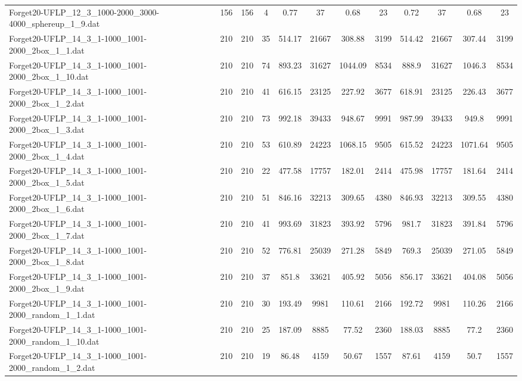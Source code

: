\begin{sidewaystable}[!ht]
{\begin{tabular}{lccccccccccc}
Forget20-UFLP\_12\_3\_1000-2000\_3000-4000\_sphereup\_1\_9.dat & 156 & 156 & 4 & 0.77 & 37 & 0.68 & 23 & 0.72 & 37 & 0.68 & 23 \\
Forget20-UFLP\_14\_3\_1-1000\_1001-2000\_2box\_1\_1.dat & 210 & 210 & 35 & 514.17 & 21667 & 308.88 & 3199 & 514.42 & 21667 &  \textcolor{blue2}{307.44} & 3199 \\
Forget20-UFLP\_14\_3\_1-1000\_1001-2000\_2box\_1\_10.dat & 210 & 210 & 74 & 893.23 & 31627 & 1044.09 & 8534 & 888.9 & 31627 & 1046.3 & 8534 \\
Forget20-UFLP\_14\_3\_1-1000\_1001-2000\_2box\_1\_2.dat & 210 & 210 & 41 & 616.15 & 23125 & 227.92 & 3677 & 618.91 & 23125 & 226.43 & 3677 \\
Forget20-UFLP\_14\_3\_1-1000\_1001-2000\_2box\_1\_3.dat & 210 & 210 & 73 & 992.18 & 39433 &  \textcolor{blue2}{948.67} & 9991 & 987.99 & 39433 & 949.8 & 9991 \\
Forget20-UFLP\_14\_3\_1-1000\_1001-2000\_2box\_1\_4.dat & 210 & 210 & 53 & 610.89 & 24223 & 1068.15 & 9505 & 615.52 & 24223 & 1071.64 & 9505 \\
Forget20-UFLP\_14\_3\_1-1000\_1001-2000\_2box\_1\_5.dat & 210 & 210 & 22 & 477.58 & 17757 & 182.01 & 2414 & 475.98 & 17757 & 181.64 & 2414 \\
Forget20-UFLP\_14\_3\_1-1000\_1001-2000\_2box\_1\_6.dat & 210 & 210 & 51 & 846.16 & 32213 & 309.65 & 4380 & 846.93 & 32213 &  \textcolor{blue2}{309.55} & 4380 \\
Forget20-UFLP\_14\_3\_1-1000\_1001-2000\_2box\_1\_7.dat & 210 & 210 & 41 & 993.69 & 31823 & 393.92 & 5796 & 981.7 & 31823 & 391.84 & 5796 \\
Forget20-UFLP\_14\_3\_1-1000\_1001-2000\_2box\_1\_8.dat & 210 & 210 & 52 & 776.81 & 25039 & 271.28 & 5849 & 769.3 & 25039 & 271.05 & 5849 \\
Forget20-UFLP\_14\_3\_1-1000\_1001-2000\_2box\_1\_9.dat & 210 & 210 & 37 & 851.8 & 33621 & 405.92 & 5056 & 856.17 & 33621 &  \textcolor{blue2}{404.08} & 5056 \\
Forget20-UFLP\_14\_3\_1-1000\_1001-2000\_random\_1\_1.dat & 210 & 210 & 30 & 193.49 & 9981 & 110.61 & 2166 & 192.72 & 9981 & 110.26 & 2166 \\
Forget20-UFLP\_14\_3\_1-1000\_1001-2000\_random\_1\_10.dat & 210 & 210 & 25 & 187.09 & 8885 & 77.52 & 2360 & 188.03 & 8885 & 77.2 & 2360 \\
Forget20-UFLP\_14\_3\_1-1000\_1001-2000\_random\_1\_2.dat & 210 & 210 & 19 & 86.48 & 4159 & 50.67 & 1557 & 87.61 & 4159 & 50.7 & 1557 \\

\end{tabular}}
\end{sidewaystable}
